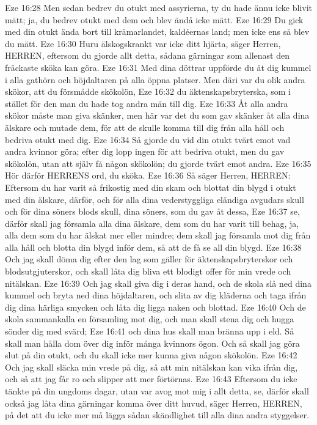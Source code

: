 Eze 16:28  Men sedan bedrev du otukt med assyrierna, ty du hade ännu icke blivit mätt; ja, du bedrev otukt med dem och blev ändå icke mätt.
Eze 16:29  Du gick med din otukt ända bort till krämarlandet, kaldéernas land; men icke ens så blev du mätt.
Eze 16:30  Huru älskogskrankt var icke ditt hjärta, säger Herren, HERREN, eftersom du gjorde allt detta, sådana gärningar som allenast den fräckaste sköka kan göra.
Eze 16:31  Med dina döttrar uppförde du åt dig kummel i alla gathörn och höjdaltaren på alla öppna platser. Men däri var du olik andra skökor, att du försmådde skökolön,
Eze 16:32  du äktenskapsbryterska, som i stället för den man du hade tog andra män till dig.
Eze 16:33  Åt alla andra skökor måste man giva skänker, men här var det du som gav skänker åt alla dina älskare och mutade dem, för att de skulle komma till dig från alla håll och bedriva otukt med dig.
Eze 16:34  Så gjorde du vid din otukt tvärt emot vad andra kvinnor göra; efter dig lopp ingen för att bedriva otukt, men du gav skökolön, utan att själv få någon skökolön; du gjorde tvärt emot andra.
Eze 16:35  Hör därför HERRENS ord, du sköka.
Eze 16:36  Så säger Herren, HERREN: Eftersom du har varit så frikostig med din skam och blottat din blygd i otukt med din älskare, därför, och för alla dina vederstyggliga eländiga avgudars skull och för dina söners blods skull, dina söners, som du gav åt dessa,
Eze 16:37  se, därför skall jag församla alla dina älskare, dem som du har varit till behag, ja, alla dem som du har älskat mer eller mindre; dem skall jag församla mot dig från alla håll och blotta din blygd inför dem, så att de få se all din blygd.
Eze 16:38  Och jag skall döma dig efter den lag som gäller för äktenskapsbryterskor och blodsutgjuterskor, och skall låta dig bliva ett blodigt offer för min vrede och nitälskan.
Eze 16:39  Och jag skall giva dig i deras hand, och de skola slå ned dina kummel och bryta ned dina höjdaltaren, och slita av dig kläderna och taga ifrån dig dina härliga smycken och låta dig ligga naken och blottad.
Eze 16:40  Och de skola sammankalla en församling mot dig, och man skall stena dig och hugga sönder dig med svärd;
Eze 16:41  och dina hus skall man bränna upp i eld. Så skall man hålla dom över dig inför många kvinnors ögon. Och så skall jag göra slut på din otukt, och du skall icke mer kunna giva någon skökolön.
Eze 16:42  Och jag skall släcka min vrede på dig, så att min nitälskan kan vika ifrån dig, och så att jag får ro och slipper att mer förtörnas.
Eze 16:43  Eftersom du icke tänkte på din ungdoms dagar, utan var avog mot mig i allt detta, se, därför skall också jag låta dina gärningar komma över ditt huvud, säger Herren, HERREN, på det att du icke mer må lägga sådan skändlighet till alla dina andra styggelser.
